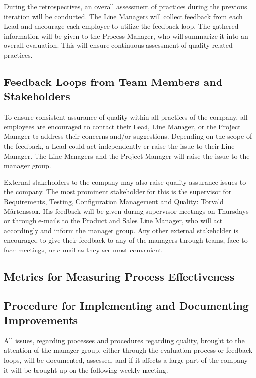 \documentclass{article}
\begin{document}
During the retrospectives, an overall assessment of practices during the previous iteration will be conducted. The Line Managers will collect feedback from each Lead and encourage each employee to utilize the feedback loop. The gathered information will be given to the Process Manager, who will summarize it into an overall evaluation. This will ensure continuous assessment of quality related practices.


\subsection{Feedback Loops from Team Members and Stakeholders}
To ensure consistent assurance of quality within all practices of the company, all employees are encouraged to contact their Lead, Line Manager, or the Project Manager to address their concerns and/or suggestions. Depending on the scope of the feedback, a Lead could act independently or raise the issue to their Line Manager. The Line Managers and the Project Manager will raise the issue to the manager group.

External stakeholders to the company may also raise quality assurance issues to the company. The most prominent stakeholder for this is the supervisor for Requirements, Testing, Configuration Management and Quality: Torvald Mårtensson. His feedback will be given during supervisor meetings on Thursdays or through e-mails to the Product and Sales Line Manager, who will act accordingly and inform the manager group. Any other external stakeholder is encouraged to give their feedback to any of the managers through teams, face-to-face meetings, or e-mail as they see most convenient. 

\subsection{Metrics for Measuring Process Effectiveness}
\label{metrics_for_measuring_process_effectiveness}


\subsection{Procedure for Implementing and Documenting Improvements}
All issues, regarding processes and procedures regarding quality, brought to the attention of the manager group, either through the evaluation process or feedback loops, will be documented, assessed, and if it affects a large part of the company it will be brought up on the following weekly meeting. 
\end{document}
